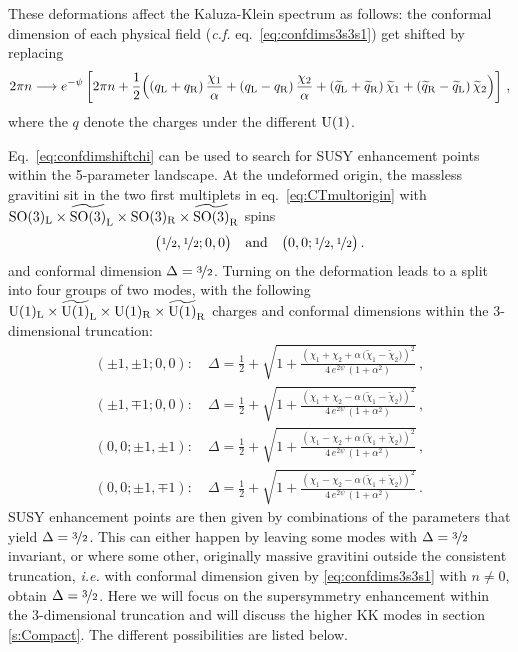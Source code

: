 \documentclass[a4paper, 11pt]{article}
\numberwithin{equation}{section}
\newcommand{\ts}[1]{\widetilde{#1}}
\newcommand{\+}{\oplus}
\begin{document}
These deformations affect the Kaluza-Klein spectrum as follows: the conformal dimension of each physical field (\textit{c.f.} eq.~\eqref{eq:confdims3s3s1}) get shifted by replacing
\begin{equation} \label{eq:confdimshiftchi}
	2\pi n\longrightarrow e^{-\psi} \left[ 2\pi n + \frac{1}{2}\Big((q_{\rm L}+q_{\rm R})\,\frac{\chi_{1}}{\alpha}+(q_{\rm L}-q_{\rm R})\,\frac{\chi_{2}}{\alpha}+ (\ts{q}_{\rm L}+\ts{q}_{\rm R})\,\ts{\chi}_{1} + (\ts{q}_{\rm R}-\ts{q}_{\rm L})\,\ts{\chi}_{2}\Big) \right]\,,
\end{equation}
where the $q$ denote the charges under the different ${\rm U}(1)$.

Eq.~\eqref{eq:confdimshiftchi} can be used to search for SUSY enhancement points within the 5-parameter landscape. At the undeformed origin, the massless gravitini sit in the two first multiplets in eq.~\eqref{eq:CTmultorigin} with ${\rm SO}(3)_{\rm L}\times\ts{{\rm SO}(3)}_{\rm L}\times{\rm SO}(3)_{\rm R}\times\ts{{\rm SO}(3)}_{\rm R}$ spins
\begin{equation}
	\big(\nicefrac{1}{2},\nicefrac{1}{2};0,0\big) \quad {\rm and} \quad \big(0,0;\nicefrac{1}{2},\nicefrac{1}{2}\big)\,.
\end{equation}
and conformal dimension $\Delta=\nicefrac{3}{2}$. Turning on the deformation leads to a split into four groups of two modes, with the following ${\rm U}(1)_{\rm L}\times\ts{{\rm U}(1)}_{\rm L}\times{\rm U}(1)_{\rm R}\times\ts{{\rm U}(1)}_{\rm R}$ charges and conformal dimensions within the 3-dimensional truncation:
\begin{equation}
	\begin{split}
		\left(\pm1,\pm1;0,0\right):\quad \Delta=\frac{1}{2}+\sqrt{1 + \frac{\left(
		\chi_{1}+\chi_{2}+\alpha\,\big(\ts{\chi}_{1}-\ts{\chi}_{2}\big)\right)^{2}}{4\, e^{2\psi}\, (1+\alpha^{2})}}\,, \\
		\left(\pm1,\mp1;0,0\right):\quad \Delta=\frac{1}{2}+\sqrt{1 + \frac{\left(
		\chi_{1}+\chi_{2}-\alpha\,\big(\ts{\chi}_{1}-\ts{\chi}_{2}\big)\right)^{2}}{4\, e^{2\psi}\, (1+\alpha^{2})}}\,, \\
		\left(0,0;\pm1,\pm1\right):\quad \Delta=\frac{1}{2}+\sqrt{1 + \frac{\left(
		\chi_{1}-\chi_{2}+\alpha\,\big(\ts{\chi}_{1}+\ts{\chi}_{2}\big)\right)^{2}}{4\, e^{2\psi}\, (1+\alpha^{2})}}\,, \\
		\left(0,0;\pm1,\mp1\right):\quad \Delta=\frac{1}{2}+\sqrt{1 + \frac{\left(
		\chi_{1}-\chi_{2} - \alpha\,\big(\ts{\chi}_{1}+\ts{\chi}_{2}\big)\right)^{2}}{4\, e^{2\psi}\, (1+\alpha^{2})}}\,.
	\end{split}
\end{equation}
SUSY enhancement points are then given by combinations of the parameters that yield $\Delta = \nicefrac32$. This can either happen by leaving some modes with $\Delta=\nicefrac{3}{2}$ invariant, or where some other, originally massive gravitini outside the consistent truncation, \textit{i.e.} with conformal dimension given by \eqref{eq:confdims3s3s1} with $n \neq 0$, obtain $\Delta = \nicefrac32$. Here we will focus on the supersymmetry enhancement within the 3-dimensional truncation and will discuss the higher KK modes in section \ref{s:Compact}. The different possibilities are listed below.
\end{document}
